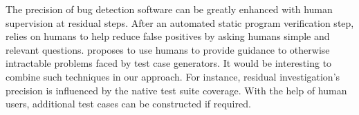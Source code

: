The precision of bug detection software can be greatly enhanced with
human supervision at residual steps.  After an automated static
program verification step, \cite{Dillig:2012:AED:2254064.2254087}
relies on humans to help reduce false positives by asking humans simple
and relevant questions.  \cite{Xie2012SCAM} proposes to use humans to
provide guidance to otherwise intractable problems faced by test case
generators.  It would be interesting to combine such techniques in our
approach.  For instance, residual investigation's precision is
influenced by the native test suite coverage.  With the help of human
users, additional test cases can be constructed if required.
